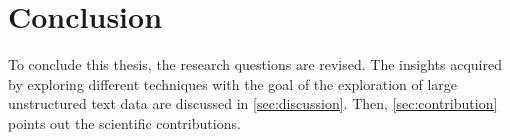 \chapter{Conclusion}\label{ch:conclusion}

To conclude this thesis, the research questions are revised.
The insights acquired by exploring different techniques with the goal of the exploration of large unstructured text data
are discussed in \autoref{sec:discussion}.
Then, \autoref{sec:contribution} points out the scientific contributions.






